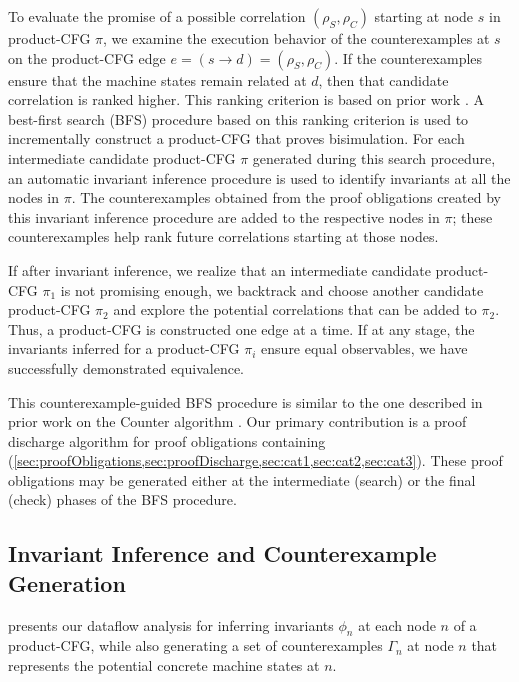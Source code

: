 To evaluate the promise of a possible correlation
$(\rho_S,\rho_C)$ starting at node $s$
in product-CFG $\pi$,
we examine the execution
behavior of the counterexamples at $s$ on
the product-CFG edge $e=(s\rightarrow d)=(\rho_S,\rho_C)$.
If the counterexamples ensure that the machine
states remain
related at $d$, then that candidate correlation
is ranked higher.
This ranking criterion is based on prior work \cite{oopsla20}.
A best-first search (BFS) procedure based on this ranking
criterion is used to incrementally construct
a product-CFG that proves bisimulation.
For each intermediate candidate product-CFG $\pi$ generated
during this search procedure,
an automatic invariant inference procedure is used
to identify invariants at all the nodes in $\pi$.
The counterexamples
obtained from the proof obligations created
by this invariant inference procedure are added to the
respective nodes in $\pi$; these counterexamples
help rank future correlations starting at those
nodes.

If after invariant inference,
we realize that an intermediate candidate product-CFG $\pi_1$
is not promising enough,
we backtrack and choose another
candidate product-CFG $\pi_2$ and explore the potential correlations that
can be added to $\pi_2$.
Thus, a product-CFG is constructed one edge at a time.
If at any stage, the invariants inferred for a product-CFG
$\pi_i$ ensure equal
observables, we have successfully demonstrated equivalence.

This counterexample-guided BFS procedure
is similar to the one described in prior work on
the Counter algorithm \cite{oopsla20}. Our
primary contribution is a proof discharge
algorithm for proof obligations containing
\recursiveRelations{}
(\cref{sec:proofObligations,sec:proofDischarge,sec:cat1,sec:cat2,sec:cat3}).
These proof obligations may
be generated either at the intermediate (search) or
the final (check)
phases of the BFS procedure.




\subsection{Invariant Inference and Counterexample Generation}
\label{sec:invinferalgo}

 presents our dataflow analysis for inferring invariants $\phi_n$
at each node $n$ of a product-CFG, while also generating a set of counterexamples $\Gamma_n$ at node $n$
that represents the potential concrete machine states at $n$.

